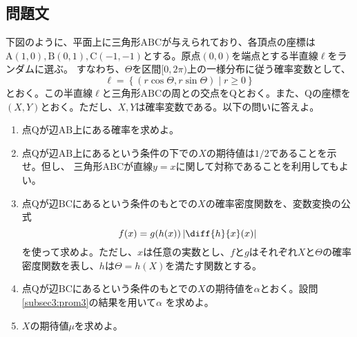 \subsection{問題文}
下図のように、平面上に三角形$\mathrm{ABC}$が与えられており、各頂点の座標は
$\mathrm{A(1, 0), B(0, 1), C(-1, -1)}$とする。原点$(0, 0)$を端点とする半直線$\ell$をランダムに選ぶ。
すなわち、$\Theta$を区間$[0, 2\pi)$上の一様分布に従う確率変数として、
\begin{equation*}
    \ell = \left\{(r\cos\Theta, r\sin\Theta) \mid r \geq 0\right\}
\end{equation*}
とおく。この半直線$\ell$と三角形$\mathrm{ABC}$の周との交点を$\mathrm{Q}$とおく。また、$\mathrm{Q}$の座標を
$(X, Y)$とおく。ただし、$X, Y$は確率変数である。以下の問いに答えよ。
\begin{enumerate}[(1)]
    \setlength{\itemsep}{10pt}
    \item 点$\mathrm{Q}$が辺$\mathrm{AB}$上にある確率を求めよ。\label{subsec3:prom1}
    \item 点$\mathrm{Q}$が辺$\mathrm{AB}$上にあるという条件の下での$X$の期待値は$1/2$であることを示せ。但し、
    三角形$\mathrm{ABC}$が直線$y = x$に関して対称であることを利用してもよい。\label{subsec3:prom2}
    \item 点$\mathrm{Q}$が辺$\mathrm{BC}$にあるという条件のもとでの$X$の確率密度関数を、変数変換の公式
    \begin{equation*}
        f(x) = g(h(x))\left\lvert \diff{h}{x}(x) \right\rvert
    \end{equation*}
    を使って求めよ。ただし、$x$は任意の実数とし、$f$と$g$はそれぞれ$X$と$\Theta$の確率密度関数を表し、$h$は$\Theta = h(X)$を満たす関数とする。\label{subsec3:prom3}
    \item 点$\mathrm{Q}$が辺$\mathrm{BC}$にあるという条件のもとでの$X$の期待値を$\alpha$とおく。設問\ref{subsec3:prom3}の結果を用いて$\alpha$
    を求めよ。\label{subsec3:prom4}
    \item $X$の期待値$\mu$を求めよ。
\end{enumerate}
\begin{figure}[htbp]
    \centering
\end{figure}

